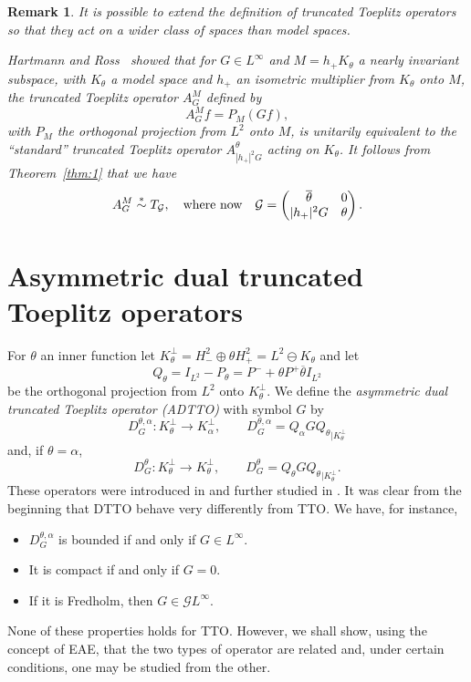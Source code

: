 \documentclass[11pt]{article}
\newtheorem{rem}[thm]{Remark}
\def\G{\mathcal G}
\def\ol{\overline}
\newcommand{\simast}{%
    \ensuremath{%
       \stackrel{\mathsf{\ast}}{\sim}}}
\begin{document}
\begin{rem}{\rm 
It is possible to extend the definition of  truncated Toeplitz operators so that
they act on a wider class of spaces than model spaces. 



Hartmann and Ross~\cite{HR13} showed that for $G \in L^\infty$ and $M=h_+K_\theta$
a nearly invariant subspace, with $K_\theta$ a model space and $h_+$ an isometric multiplier
from $K_\theta$ onto $M$, 
the
truncated Toeplitz operator $A^M_G$ defined by
\[
A^M_G f = P_M (Gf),
\]
with $P_M$ the orthogonal projection from $L^2$ onto $M$, is unitarily equivalent to
the ``standard'' truncated Toeplitz operator $A^\theta_{|h_+|^2 G}$ acting on $K_\theta$.
It follows from Theorem~\ref{thm:1} that we have
\[
A^M_G \simast T_\G, \quad \hbox{where now} \quad
\G= \begin{pmatrix} \ol\theta & 0 \\ |h_+|^2G & \theta \end{pmatrix}.
\]
}
\end{rem}



\section{Asymmetric dual truncated Toeplitz operators}
\label{sec:4jul30}


For $\theta$ an inner function let $K_\theta^\perp= H^2_- \oplus \theta H^2_+=L^2 \ominus K_\theta$ and let
\[
Q_\theta = I_{L^2}-P_\theta = P^- + \theta P^+ \ol\theta I_{L^2}
\]
be the orthogonal projection from $L^2$ onto $K^\perp_\theta$. We define the 
{\em asymmetric dual truncated Toeplitz operator (ADTTO)\/} with symbol $G$
by
\[
D_G^{\theta,\alpha}: K^\perp_\theta \to K^\perp_\alpha, \qquad D^{\theta,\alpha}_G= Q_\alpha G {Q_\theta}_{|K_\theta^\perp}
\]
and, if $\theta=\alpha$,
\[
D_G^\theta: K_\theta^\perp \to K_\theta^\perp, \qquad D_G^\theta=Q_\theta G{ Q_\theta}_{|K_\theta^\perp}.
\]
These operators were introduced in \cite{ding} and further studied in \cite{CKLP}.
It was clear from the beginning that DTTO behave very differently from TTO. We have, for instance,
\begin{itemize}
\item $D_G^{\theta,\alpha}$ is bounded if and only if $G \in L^\infty$.
\item It is compact if and only if $G=0$.
\item If it is Fredholm, then $G \in \G L^\infty$.
\end{itemize}
None of these properties holds for TTO.
However, we shall show, using the concept of EAE, that
the two types of operator are related and, 
under  certain conditions, one may be studied from the other. 
\end{document}
